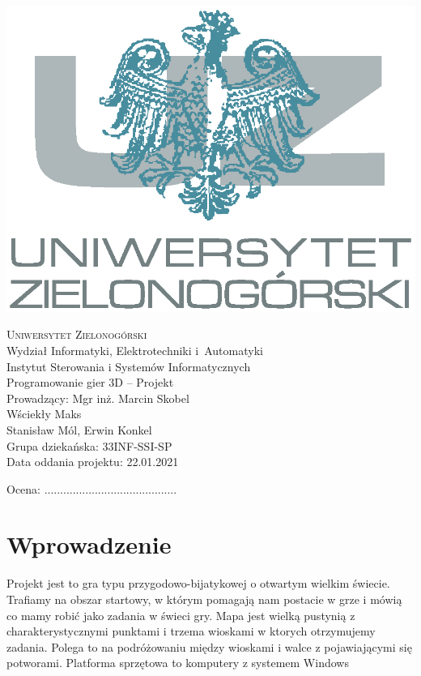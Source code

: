 \documentclass[10pt,a4paper]{article}
\begin{document}
\pagestyle{plain}
\begin{center}
\begin{center}
    \includegraphics[width=.55\textwidth]{logo}
\end{center}
\vspace{0.5cm}
\textsc{\Huge{Uniwersytet Zielonogórski}}\\
\LARGE{Wydział Informatyki, Elektrotechniki i~Automatyki}\\
\large{Instytut Sterowania i Systemów Informatycznych}\\
\vspace{0.5cm}
\Large{Programowanie gier 3D -- Projekt}\\
Prowadzący: Mgr inż. Marcin Skobel \\ 
\vspace{2cm}
\LARGE{Wściekły Maks}\\
\vspace{2cm} 
\Large{Stanisław Mól, Erwin Konkel} \\
\Large{Grupa dziekańska: 33INF-SSI-SP} \\
\vspace{0.5cm} 
\Large{Data oddania projektu: 22.01.2021}
\vspace{4cm}
\begin{flushleft}
	Ocena: ..........................................
\end{flushleft}
\vspace{1cm}
\end{center}

%
%
\footnotesize
\tableofcontents


%
%
\footnotesize
\lstlistoflistings

\noindent\makebox[\linewidth]{\rule{0.6\paperwidth}{0.4pt}}

\clearpage
\section{Wprowadzenie}
Projekt jest to gra typu przygodowo-bijatykowej o otwartym wielkim świecie. Trafiamy na obszar startowy, w którym pomagają nam postacie w grze i mówią co mamy robić jako zadania w świeci gry. Mapa jest wielką pustynią z charakterystycznymi punktami i trzema wioskami w ktorych otrzymujemy zadania. Polega to na podróżowaniu między wioskami i walce z pojawiającymi się potworami. Platforma sprzętowa to komputery z systemem Windows
\end{document}
